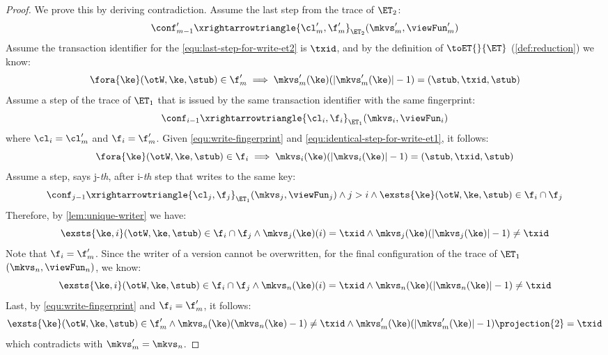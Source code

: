 \begin{proof}
    We prove this by deriving contradiction.
    Assume the last step from the trace of \( \ET_2 \):
    \begin{equation}
        \label{equ:last-step-for-write-et2}
        \conf'_{m-1} \xrightarrowtriangle{\cl'_m, \f'_m}_{\ET_{2}} (\mkvs'_m, \viewFun'_m )
    \end{equation}
    Assume the transaction identifier for the \cref{equ:last-step-for-write-et2} is \( \txid \), and by the definition of \( \toET{}{\ET}\) (\cref{def:reduction}) we know:
    \begin{equation}
        \label{equ:write-fingerprint}
        \fora{\ke} (\otW, \ke, \stub) \in \f'_m \implies \mkvs'_m(\ke)(\lvert\mkvs'_m(\ke)\rvert - 1) = (\stub, \txid, \stub)
    \end{equation}
    Assume a step of the trace of \( \ET_1 \) that is issued by the same transaction identifier with the same fingerprint:
    \begin{equation}
        \label{equ:identical-step-for-write-et1}
        \conf_{i-1} \xrightarrowtriangle{\cl_i, \f_i}_{\ET_{1}} (\mkvs_i, \viewFun_i)
    \end{equation}
    where \( \cl_i = \cl'_m \) and \( \f_i = \f'_m \).
    Given \cref{equ:write-fingerprint} and \cref{equ:identical-step-for-write-et1}, it follows:
    \[
        \fora{\ke} (\otW, \ke, \stub) \in \f_i \implies \mkvs_i(\ke)(\lvert\mkvs_i(\ke)\rvert - 1) = (\stub, \txid, \stub)
    \]
    Assume a step, says j-\emph{th}, after i-\emph{th} step that writes to the same key:
    \[
        \conf_{j-1} \xrightarrowtriangle{\cl_j, \f_j}_{\ET_{1}} (\mkvs_j, \viewFun_j) 
        \land j > i
        \land \exsts{\ke} (\otW, \ke, \stub) \in \f_i \cap \f_j
    \]
    Therefore, by \cref{lem:unique-writer} we have:
    \[
        \exsts{\ke,i} (\otW, \ke, \stub) \in \f_i \cap \f_j \land \mkvs_j(\ke)(i) = \txid \land \mkvs_j(\ke)(\lvert \mkvs_j(\ke) \rvert - 1) \neq \txid
    \]
    Note that \( \f_i = \f'_m\).
    Since the writer of a version cannot be overwritten, for the final configuration of the trace of \( \ET_1 \) \((\mkvs_n, \viewFun_n)\), we know:
    \[
        \exsts{\ke,i} (\otW, \ke, \stub) \in \f_i \cap \f_j \land \mkvs_n(\ke)(i) = \txid \land \mkvs_n(\ke)(\lvert \mkvs_n(\ke) \rvert - 1) \neq \txid
    \]
    Last, by \cref{equ:write-fingerprint} and \( \f_i = \f'_m\), it follows:
    \[
        \exsts{\ke} (\otW, \ke, \stub) \in \f'_m \land \mkvs_n(\ke)(\mkvs_n(\ke) - 1) \neq \txid \land \mkvs'_m(\ke)(\lvert\mkvs'_m(\ke)\rvert - 1)\projection{2} = \txid
    \]
    which contradicts with \( \mkvs'_m = \mkvs_n\).
\end{proof}

